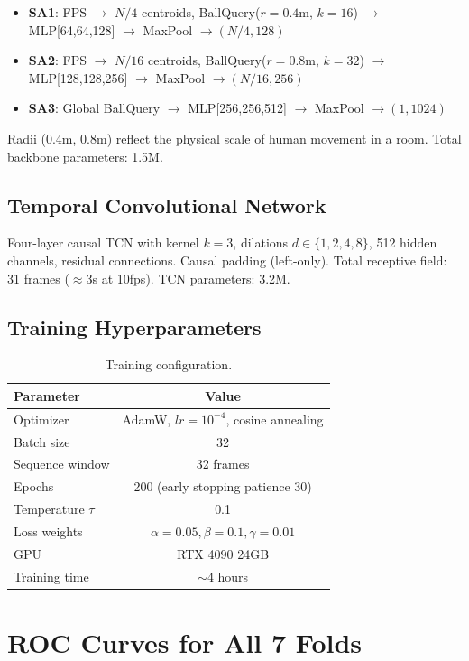\documentclass[11pt,a4paper]{article}
\begin{document}
\begin{itemize}[leftmargin=*,nosep]
    \item \textbf{SA1}: FPS $\to$ $N/4$ centroids, BallQuery($r{=}0.4$m, $k{=}16$) $\to$ MLP[64,64,128] $\to$ MaxPool $\to (N/4, 128)$
    \item \textbf{SA2}: FPS $\to$ $N/16$ centroids, BallQuery($r{=}0.8$m, $k{=}32$) $\to$ MLP[128,128,256] $\to$ MaxPool $\to (N/16, 256)$
    \item \textbf{SA3}: Global BallQuery $\to$ MLP[256,256,512] $\to$ MaxPool $\to (1, 1024)$
\end{itemize}

Radii (0.4m, 0.8m) reflect the physical scale of human movement in a room.
Total backbone parameters: 1.5M.

\subsection{Temporal Convolutional Network}

Four-layer causal TCN with kernel $k{=}3$, dilations $d \in \{1,2,4,8\}$, 512 hidden channels, residual connections.
Causal padding (left-only). Total receptive field: 31 frames ($\approx$3s at 10fps).
TCN parameters: 3.2M.

\subsection{Training Hyperparameters}

\begin{table}[H]
\centering
\caption{Training configuration.}
\begin{tabular}{lc}
\toprule
\textbf{Parameter} & \textbf{Value} \\
\midrule
Optimizer & AdamW, $lr{=}10^{-4}$, cosine annealing \\
Batch size & 32 \\
Sequence window & 32 frames \\
Epochs & 200 (early stopping patience 30) \\
Temperature $\tau$ & 0.1 \\
Loss weights & $\alpha{=}0.05, \beta{=}0.1, \gamma{=}0.01$ \\
GPU & RTX 4090 24GB \\
Training time & $\sim$4 hours \\
\bottomrule
\end{tabular}
\end{table}

\section{ROC Curves for All 7 Folds}
\end{document}
